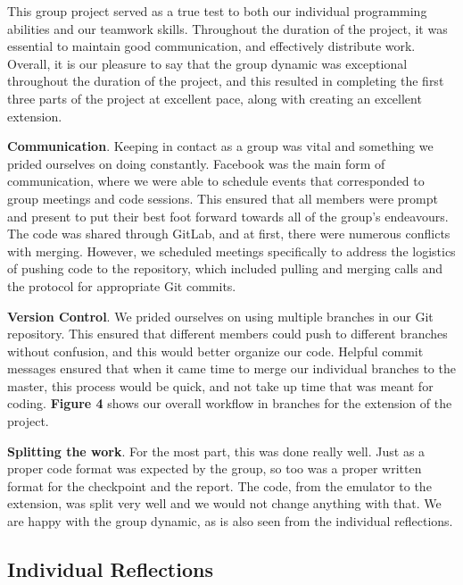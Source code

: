 \documentclass[11pt]{article}
\begin{document}
This group project served as a true test to both our individual programming abilities and our teamwork skills. Throughout the duration of the project, it was essential to maintain good communication, and effectively distribute work. Overall, it is our pleasure to say that the group dynamic was exceptional throughout the duration of the project, and this resulted in completing the first three parts of the project at excellent pace, along with creating an excellent extension.

\vspace{0.2in}

\textbf{Communication}. Keeping in contact as a group was vital and something we prided ourselves on doing constantly. Facebook was the main form of communication, where we were able to schedule events that corresponded to group meetings and code sessions. This ensured that all members were prompt and present to put their best foot forward towards all of the group's endeavours. The code was shared through GitLab, and at first, there were numerous conflicts with merging. However, we scheduled meetings specifically to address the logistics of pushing code to the repository, which included pulling and merging calls and the protocol for appropriate Git commits.

\vspace{0.2in}

\textbf{Version Control}. We prided ourselves on using multiple branches in our Git repository. This ensured that different members could push to different branches without confusion, and this would better organize our code. Helpful commit messages ensured that when it came time to merge our individual branches to the master, this process would be quick, and not take up time that was meant for coding. \textbf{Figure 4} shows our overall workflow in branches for the extension of the project.

\vspace{0.2in}

\textbf{Splitting the work}. For the most part, this was done really well. Just as a proper code format was expected by the group, so too was a proper written format for the checkpoint and the report. The code, from the emulator to the extension, was split very well and we would not change anything with that. We are happy with the group dynamic, as is also seen from the individual reflections.

\subsection{Individual Reflections}
\end{document}
